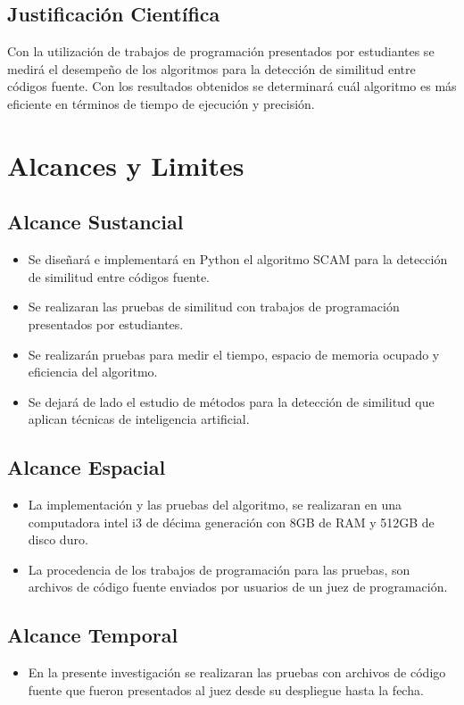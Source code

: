 \subsection{Justificación Científica}
Con la utilización de trabajos de programación presentados por estudiantes se medirá el desempeño de los algoritmos para la detección de similitud entre códigos fuente. Con los resultados obtenidos se determinará cuál algoritmo es más eficiente en términos de tiempo de ejecución y precisión.
\section{Alcances y Limites}
\subsection{Alcance Sustancial}
\begin{itemize}
    \item Se diseñará e implementará en Python el algoritmo SCAM para la detección de similitud entre códigos fuente.
    \item Se realizaran las pruebas de similitud con trabajos de programación presentados por estudiantes.
    \item Se realizarán pruebas para medir el tiempo, espacio de memoria ocupado y eficiencia del algoritmo.
    \item Se dejará de lado el estudio de métodos para la detección de similitud que aplican técnicas de inteligencia artificial.
\end{itemize}
\subsection{Alcance Espacial}
\begin{itemize}
  \item La implementación y las pruebas del algoritmo, se realizaran en una computadora intel i3 de décima generación con 8GB de RAM y 512GB de disco duro.
  \item La procedencia de los trabajos de programación para las pruebas, son archivos de código fuente enviados por usuarios de un juez de programación.
\end{itemize}
\subsection{Alcance Temporal}
\begin{itemize}
  \item En la presente investigación se realizaran las pruebas con archivos de código fuente que fueron presentados al juez desde su despliegue hasta la fecha.
\end{itemize}
